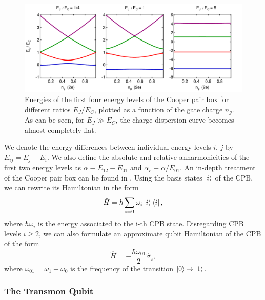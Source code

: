 \begin{figure}[ht!]
	\includegraphics[width=\textwidth]{"./material/mathematica/cooper_pair_box_energies"}
	\caption{Energies of the first four energy levels of the Cooper pair box for different ratios $E_J/E_C$, plotted as a function of the gate charge $n_g$. As can be seen, for $E_J \gg E_C$, the charge-dispersion curve becomes almost completely flat.}
	\label{fig:CooperPairBoxEnergies}
\end{figure}

We denote the energy differences between individual energy levels $i$, $j$ by $E_{ij} = E_j - E_i$. We also define the absolute and relative anharmonicities of the first two energy levels as $\alpha \equiv E_{12}-E_{01}$ and $\alpha_r \equiv \alpha / E_{01}$. An in-depth treatment of the Cooper pair box can be found in \citep{cottet_implementation_2002}. Using the basis states $\left| i \right>$ of the CPB, we can rewrite its Hamiltonian in the form 
%
\begin{equation}
\hat{H} = \hbar\sum\limits_{i=0} \omega_i\left| i \right>\left< i \right|,
\end{equation}
%
where $\hbar\omega_i$ is the energy associated to the i-th CPB state. Disregarding CPB levels $i \ge 2$, we can also formulate an approximate qubit Hamiltonian of the CPB of the form
%
\begin{equation}
\hat{H} = -\frac{\hbar\omega_{01}}{2}\hat{\sigma}_z, \label{eq:cpb_qubit_hamiltonian}
\end{equation}
%
where $\omega_{01}=\omega_1-\omega_0$ is the frequency of the transition $\left| 0 \right>\to\left| 1 \right>$.

\subsubsection{The Transmon Qubit}

